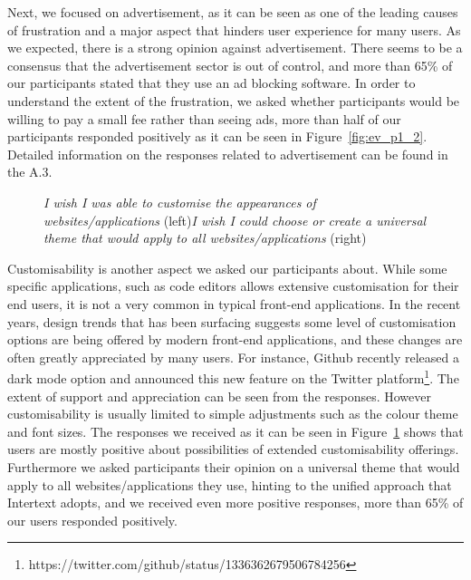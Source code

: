 Next, we focused on advertisement, as it can be seen as one of the leading causes of frustration and a major aspect that hinders user experience for many users. As we expected, there is a strong opinion against advertisement. There seems to be a consensus that the advertisement sector is out of control, and more than 65\% of our participants stated that they use an ad blocking software. In order to understand the extent of the frustration, we asked whether participants would be willing to pay a small fee rather than seeing ads, more than half of our participants responded positively as it can be seen in Figure~\ref{fig:ev_p1_2}. Detailed information on the responses related to advertisement can be found in the  A.3.


\begin{figure}[H]
\centering
{}
\vspace*{-5mm}
\caption{\newline\textit{I wish I was able to customise the appearances of websites/applications} (left)\newline\textit{I wish I could choose or create a universal theme that would apply to all websites/applications} (right)} \label{fig:ev_p1_3}
\end{figure}

Customisability is another aspect we asked our participants about. While some specific applications, such as code editors allows extensive customisation for their end users, it is not a very common in typical front-end applications. In the recent years, design trends that has been surfacing suggests some level of customisation options are being offered by modern front-end applications, and these changes are often greatly appreciated by many users. For instance, Github recently released a dark mode option and announced this new feature on the Twitter platform\footnote{https://twitter.com/github/status/1336362679506784256}. The extent of support and appreciation can be seen from the responses. However customisability is usually limited to simple adjustments such as the colour theme and font sizes. The responses we received as it can be seen in Figure~\ref{fig:ev_p1_3} shows that users are mostly positive about possibilities of extended customisability offerings. Furthermore we asked participants their opinion on a universal theme that would apply to all websites/applications they use, hinting to the unified approach that Intertext adopts, and we received even more positive responses, more than 65\% of our users responded positively.

